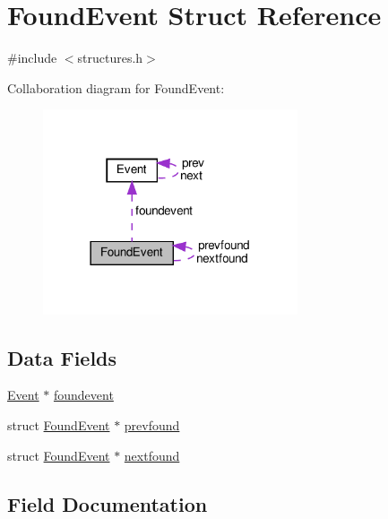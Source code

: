 \hypertarget{struct_found_event}{}\section{Found\+Event Struct Reference}
\label{struct_found_event}


{\ttfamily \#include $<$structures.\+h$>$}



Collaboration diagram for Found\+Event\+:\nopagebreak
\begin{figure}[H]
\begin{center}
\leavevmode
\includegraphics[width=213pt]{struct_found_event__coll__graph}
\end{center}
\end{figure}
\subsection*{Data Fields}
\begin{DoxyCompactItemize}
\item 
\hyperlink{struct_event}{Event} $\ast$ \hyperlink{struct_found_event_a9fb10dd8687d775ac50c8824bde19d67}{foundevent}
\item 
struct \hyperlink{struct_found_event}{Found\+Event} $\ast$ \hyperlink{struct_found_event_add29159b298db5eb8c68bd9314e7c498}{prevfound}
\item 
struct \hyperlink{struct_found_event}{Found\+Event} $\ast$ \hyperlink{struct_found_event_acbce65ffd090e8c5d45aa15b2ccdf453}{nextfound}
\end{DoxyCompactItemize}


\subsection{Field Documentation}
\mbox{\label{struct_found_event_a9fb10dd8687d775ac50c8824bde19d67}} 
